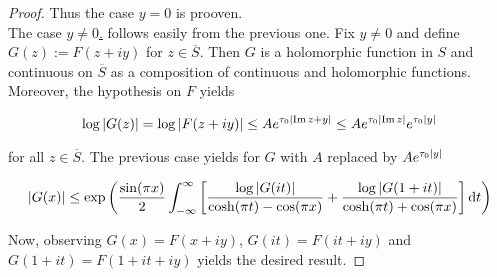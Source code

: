 \begin{proof}
Thus the case $y = 0$ is prooven.\\
The case \underline{$y \neq 0$.} follows easily from the previous one. Fix $y \neq 0$ and define $G(z) := F(z + iy)$ for $z \in \overline{S}$. Then $G$ is a holomorphic function in $S$ and continuous on $\overline{S}$ as a composition of continuous and holomorphic functions. Moreover, the hypothesis on $F$ yields

		\begin{equation}
			\log \abs[0]{ G(z) } = \log \abs[0]{ F(z + iy) } \leq Ae^{\tau_0 \abs[0]{ \Im z + y}} \leq Ae^{\tau_0 \abs[0]{ \Im z }}e^{\tau_0 \abs[0]{ y }}
		\end{equation}

		for all $z \in \overline{S}$. The previous case yields for $G$ with $A$ replaced by $Ae^{\tau_0\abs[0]{ y }}$

		\begin{equation}
			\abs[0]{ G(x) } \leq \exp\del[3]{ \frac{\sin(\pi x)}{2} \int_{-\infty}^\infty \sbr{ \frac{\log \abs[0]{ G(it)}}{\cosh(\pi t) - \cos(\pi x)} + \frac{\log \abs[0]{ G(1 + it)}}{\cosh(\pi t) + \cos(\pi x)} } \d t}
		\end{equation}

		Now, observing $G(x) = F(x + iy)$, $G(it) = F(it + iy)$ and $G(1 + it) = F(1 + it + iy)$ yields the desired result.
\end{proof}

